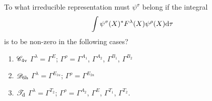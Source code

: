 \documentclass[a4paper]{book}
\begin{document}
	\begin{exercise}
		To what irreducible representation must $\psi^\sigma$ belong if the integral
		\begin{equation*}
			\int \psi^\sigma(X)^* F^\lambda(X) \psi^\rho (X) {\rm d}\tau
		\end{equation*}
		is to be non-zero in the following cases?
		\begin{enumerate}[label=(\alph*)]
		\item $\mathscr{C}_{\rm 4v}$  $\Gamma^\lambda = \Gamma^E$; $\Gamma^\rho = \Gamma^{A_1}$, $\Gamma^{A_2}$, $\Gamma^{B_1}$, $\Gamma^{B_2}$
		\item $\mathscr{D}_{\rm 6h}$  $\Gamma^\lambda = \Gamma^{E_{1u}}$; $\Gamma^\rho = \Gamma^{E_{2u}}$
		\item $\mathscr{T}_{\rm d}$  $\Gamma^\lambda = \Gamma^{T_2}$; $\Gamma^\rho = \Gamma^{A_2}$, $\Gamma^{E}$, $\Gamma^{T_1}$, $\Gamma^{T_2}$.
		\end{enumerate}
		
	\end{exercise}
	
\end{document}
